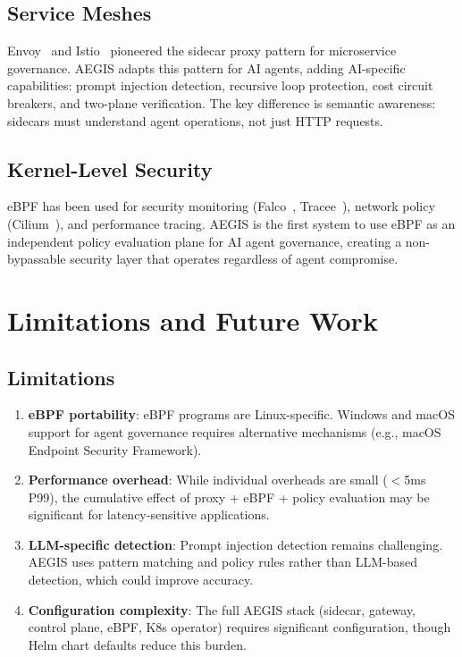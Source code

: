 \documentclass[runningheads]{llncs}
\begin{document}
\subsection{Service Meshes}

Envoy~\cite{envoy2024} and Istio~\cite{istio2024} pioneered the sidecar proxy pattern for microservice governance. AEGIS adapts this pattern for AI agents, adding AI-specific capabilities: prompt injection detection, recursive loop protection, cost circuit breakers, and two-plane verification. The key difference is semantic awareness: sidecars must understand agent operations, not just HTTP requests.

\subsection{Kernel-Level Security}

eBPF has been used for security monitoring (Falco~\cite{falco2024}, Tracee~\cite{tracee2024}), network policy (Cilium~\cite{cilium2024}), and performance tracing. AEGIS is the first system to use eBPF as an independent policy evaluation plane for AI agent governance, creating a non-bypassable security layer that operates regardless of agent compromise.

\section{Limitations and Future Work}

\subsection{Limitations}

\begin{enumerate}
\item \textbf{eBPF portability}: eBPF programs are Linux-specific. Windows and macOS support for agent governance requires alternative mechanisms (e.g., macOS Endpoint Security Framework).
\item \textbf{Performance overhead}: While individual overheads are small ($<$5ms P99), the cumulative effect of proxy + eBPF + policy evaluation may be significant for latency-sensitive applications.
\item \textbf{LLM-specific detection}: Prompt injection detection remains challenging. AEGIS uses pattern matching and policy rules rather than LLM-based detection, which could improve accuracy.
\item \textbf{Configuration complexity}: The full AEGIS stack (sidecar, gateway, control plane, eBPF, K8s operator) requires significant configuration, though Helm chart defaults reduce this burden.
\end{enumerate}
\end{document}
